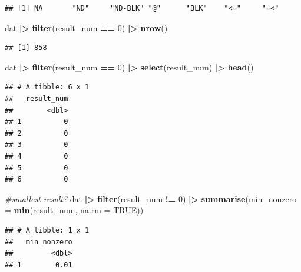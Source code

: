 \documentclass[
]{article}
\newenvironment{Shaded}{\begin{snugshade}}{\end{snugshade}}
\newcommand{\AttributeTok}[1]{\textcolor[rgb]{0.13,0.29,0.53}{#1}}
\newcommand{\CommentTok}[1]{\textcolor[rgb]{0.56,0.35,0.01}{\textit{#1}}}
\newcommand{\ConstantTok}[1]{\textcolor[rgb]{0.56,0.35,0.01}{#1}}
\newcommand{\DecValTok}[1]{\textcolor[rgb]{0.00,0.00,0.81}{#1}}
\newcommand{\FunctionTok}[1]{\textcolor[rgb]{0.13,0.29,0.53}{\textbf{#1}}}
\newcommand{\NormalTok}[1]{#1}
\newcommand{\SpecialCharTok}[1]{\textcolor[rgb]{0.81,0.36,0.00}{\textbf{#1}}}
\begin{document}
\begin{verbatim}
## [1] NA       "ND"     "ND-BLK" "@"      "BLK"    "<="     "=<"
\end{verbatim}

\begin{Shaded}
\begin{Highlighting}[]
\NormalTok{dat }\SpecialCharTok{|\textgreater{}} 
  \FunctionTok{filter}\NormalTok{(result\_num }\SpecialCharTok{==} \DecValTok{0}\NormalTok{) }\SpecialCharTok{|\textgreater{}} 
  \FunctionTok{nrow}\NormalTok{()}
\end{Highlighting}
\end{Shaded}

\begin{verbatim}
## [1] 858
\end{verbatim}

\begin{Shaded}
\begin{Highlighting}[]
\NormalTok{dat }\SpecialCharTok{|\textgreater{}} 
  \FunctionTok{filter}\NormalTok{(result\_num }\SpecialCharTok{==} \DecValTok{0}\NormalTok{) }\SpecialCharTok{|\textgreater{}} 
  \FunctionTok{select}\NormalTok{(result\_num) }\SpecialCharTok{|\textgreater{}} 
  \FunctionTok{head}\NormalTok{() }
\end{Highlighting}
\end{Shaded}

\begin{verbatim}
## # A tibble: 6 x 1
##   result_num
##        <dbl>
## 1          0
## 2          0
## 3          0
## 4          0
## 5          0
## 6          0
\end{verbatim}

\begin{Shaded}
\begin{Highlighting}[]
\CommentTok{\#smallest result? }
\NormalTok{dat }\SpecialCharTok{|\textgreater{}} 
  \FunctionTok{filter}\NormalTok{(result\_num }\SpecialCharTok{!=} \DecValTok{0}\NormalTok{) }\SpecialCharTok{|\textgreater{}} 
  \FunctionTok{summarise}\NormalTok{(}\AttributeTok{min\_nonzero =} \FunctionTok{min}\NormalTok{(result\_num, }\AttributeTok{na.rm =} \ConstantTok{TRUE}\NormalTok{))}
\end{Highlighting}
\end{Shaded}

\begin{verbatim}
## # A tibble: 1 x 1
##   min_nonzero
##         <dbl>
## 1        0.01
\end{verbatim}
\end{document}
